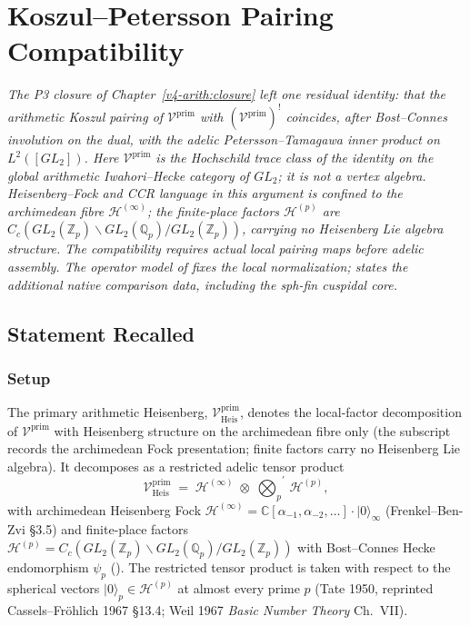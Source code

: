 \chapter{Koszul--Petersson Pairing Compatibility}
\label{v4-arith:kp-compat}

\emph{The P3 closure of Chapter~\ref{v4-arith:closure} left one
residual identity: that the arithmetic Koszul pairing of
\(\mathcal{V}^{\mathrm{prim}}\) with \((\mathcal{V}^{\mathrm{prim}})^{!}\)
coincides, after Bost--Connes involution on the dual, with the
adelic Petersson--Tamagawa inner product on \(L^{2}([GL_{2}])\).
Here \(\mathcal{V}^{\mathrm{prim}}\) is the Hochschild trace class
of the identity on the global arithmetic Iwahori--Hecke category of \(GL_{2}\);
it is not a vertex algebra. Heisenberg--Fock and CCR language in this
argument is confined to the archimedean fibre \(\mathcal{H}^{(\infty)}\);
the finite-place factors \(\mathcal{H}^{(p)}\) are
\(C_{c}(GL_{2}(\mathbb{Z}_{p})\backslash GL_{2}(\mathbb{Q}_{p})/GL_{2}(\mathbb{Z}_{p}))\),
carrying no Heisenberg Lie algebra structure.
The compatibility requires actual local pairing maps before
adelic assembly. The operator model of
 fixes the local normalization;
 states the additional
native comparison data, including the sph-fin cuspidal core.}

\section{Statement Recalled}
\label{v4-arith:kp:statement}

\subsection{Setup}
\label{v4-arith:kp:setup}

The primary arithmetic Heisenberg, \(\mathcal{V}^{\mathrm{prim}}_{\mathrm{Heis}}\),
denotes the local-factor decomposition of \(\mathcal{V}^{\mathrm{prim}}\)
with Heisenberg structure on the archimedean fibre only (the subscript
records the archimedean Fock presentation; finite factors carry no
Heisenberg Lie algebra). It decomposes as a restricted adelic tensor product
\begin{equation}
\label{v4-arith:kp:eq:Vprim-adelic}
\mathcal{V}^{\mathrm{prim}}_{\mathrm{Heis}}\;=\;
\mathcal{H}^{(\infty)}\;\otimes\;{\bigotimes_{p}}^{\!\prime}\,\mathcal{H}^{(p)},
\end{equation}
with archimedean Heisenberg Fock
\(\mathcal{H}^{(\infty)}=\mathbb{C}[\alpha_{-1},\alpha_{-2},\ldots]\cdot|0\rangle_{\infty}\)
(Frenkel--Ben-Zvi \S3.5) and finite-place factors
\(\mathcal{H}^{(p)}=C_{c}(GL_{2}(\mathbb{Z}_{p})\backslash GL_{2}(\mathbb{Q}_{p})/GL_{2}(\mathbb{Z}_{p}))\)
with Bost--Connes Hecke endomorphism
\(\psi_{p}\) ().
The restricted tensor product is taken with respect to the spherical vectors
\(|0\rangle_{p}\in\mathcal{H}^{(p)}\) at almost every prime \(p\)
(Tate 1950, reprinted Cassels--Fr\"ohlich 1967 \S13.4;
Weil 1967 \emph{Basic Number Theory} Ch.~VII).

